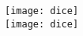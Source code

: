 \documentclass{article}
\begin{document}
\noindent
\texttt{[image: dice]}
\\
{\color{blue}\texttt{[image: dice]}}
\end{document}
